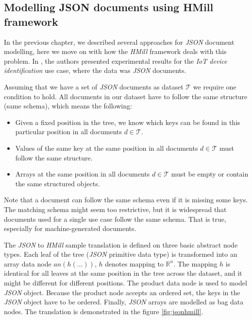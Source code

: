 

\subsection{Modelling JSON documents using HMill framework}
In the previous chapter, we described several approaches for \emph{JSON} document modelling, here we move on with how the \emph{HMill} framework deals with this problem. In \cite{Mandlik2020}, the authors presented experimental results for the \emph{IoT device identification} use case, where the data was \emph{JSON} documents.

Assuming that we have a set of \emph{JSON} documents as dataset $\mathcal{T}$ we require one condition to hold. All documents in our dataset have to follow the same structure (same schema), which means the following:
\begin{itemize}
    \itemsep0em 
    \item Given a fixed position in the tree, we know which keys can be found in this particular position in all documents $d\in\mathcal{T}$.
    \item Values of the same key at the same position in all documents $d\in\mathcal{T}$ must follow the same structure.
    \item Arrays at the same position in all documents $d\in\mathcal{T}$ must be empty or contain the same structured objects.
\end{itemize}

Note that a document can follow the same schema even if it is missing some keys. The matching schema might seem too restrictive, but it is widespread that documents used for a single use case follow the same schema. That is true, especially for machine-generated documents.

The \emph{JSON} to \emph{HMill} sample translation is defined on three basic abstract node types. Each leaf of the tree (\emph{JSON} primitive data type) is transformed into an array data node $an(h(\dots))$, $h$ denotes mapping to $\mathbb{R}^n$. The mapping $h$ is identical for all leaves at the same position in the tree across the dataset, and it might be different for different positions. The product data node is used to model \emph{JSON} object. Because the product node accepts an ordered set, the keys in the \emph{JSON} object have to be ordered. Finally, \emph{JSON} arrays are modelled as bag data nodes. The translation is demonstrated in the figure \ref{fig:jsonhmill}.

